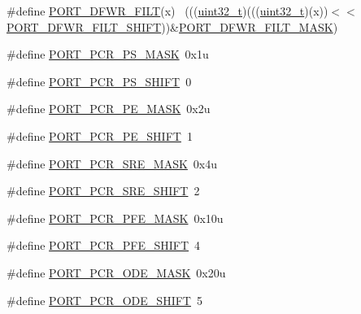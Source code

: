 \begin{DoxyCompactItemize}
\item 
\#define \hyperlink{group___p_o_r_t___register___masks_gad657e805a001c463d29fc307ecd4103e}{P\+O\+R\+T\+\_\+\+D\+F\+W\+R\+\_\+\+F\+I\+LT}(x)                                            ~(((\hyperlink{_p_e___types_8h_a33594304e786b158f3fb30289278f5af}{uint32\+\_\+t})(((\hyperlink{_p_e___types_8h_a33594304e786b158f3fb30289278f5af}{uint32\+\_\+t})(x))$<$$<$\hyperlink{group___p_o_r_t___register___masks_ga9045bd83bc548178d057bf4916c8fe08}{P\+O\+R\+T\+\_\+\+D\+F\+W\+R\+\_\+\+F\+I\+L\+T\+\_\+\+S\+H\+I\+FT}))\&\hyperlink{group___p_o_r_t___register___masks_gaf2f0bbe1dea504156dce840fdcb94b74}{P\+O\+R\+T\+\_\+\+D\+F\+W\+R\+\_\+\+F\+I\+L\+T\+\_\+\+M\+A\+SK})
\item 
\#define \hyperlink{group___p_o_r_t___register___masks_ga075e53298ec26cb1b463c95b902c39c1}{P\+O\+R\+T\+\_\+\+P\+C\+R\+\_\+\+P\+S\+\_\+\+M\+A\+SK}~0x1u
\item 
\#define \hyperlink{group___p_o_r_t___register___masks_ga7c040fa4d37750af5fef3ea1d0e370a9}{P\+O\+R\+T\+\_\+\+P\+C\+R\+\_\+\+P\+S\+\_\+\+S\+H\+I\+FT}~0
\item 
\#define \hyperlink{group___p_o_r_t___register___masks_ga125482aa2497e8435dac49c039b7fa97}{P\+O\+R\+T\+\_\+\+P\+C\+R\+\_\+\+P\+E\+\_\+\+M\+A\+SK}~0x2u
\item 
\#define \hyperlink{group___p_o_r_t___register___masks_ga18556773988cdd78e363959884dbec46}{P\+O\+R\+T\+\_\+\+P\+C\+R\+\_\+\+P\+E\+\_\+\+S\+H\+I\+FT}~1
\item 
\#define \hyperlink{group___p_o_r_t___register___masks_ga9cdf02a7b160ee528de8e18aad2cae60}{P\+O\+R\+T\+\_\+\+P\+C\+R\+\_\+\+S\+R\+E\+\_\+\+M\+A\+SK}~0x4u
\item 
\#define \hyperlink{group___p_o_r_t___register___masks_ga87657ecdc18eb5b344d4e399a3a2fb70}{P\+O\+R\+T\+\_\+\+P\+C\+R\+\_\+\+S\+R\+E\+\_\+\+S\+H\+I\+FT}~2
\item 
\#define \hyperlink{group___p_o_r_t___register___masks_ga7f1f5c3812018f9ed4d84a187146ba91}{P\+O\+R\+T\+\_\+\+P\+C\+R\+\_\+\+P\+F\+E\+\_\+\+M\+A\+SK}~0x10u
\item 
\#define \hyperlink{group___p_o_r_t___register___masks_gae7d057ebd3218784fca57f55a85f2d29}{P\+O\+R\+T\+\_\+\+P\+C\+R\+\_\+\+P\+F\+E\+\_\+\+S\+H\+I\+FT}~4
\item 
\#define \hyperlink{group___p_o_r_t___register___masks_gacbe19f0087a51a8c26c51838b7a555d2}{P\+O\+R\+T\+\_\+\+P\+C\+R\+\_\+\+O\+D\+E\+\_\+\+M\+A\+SK}~0x20u
\item 
\#define \hyperlink{group___p_o_r_t___register___masks_gac4871a3c3a20a51a3a57131d34e427e0}{P\+O\+R\+T\+\_\+\+P\+C\+R\+\_\+\+O\+D\+E\+\_\+\+S\+H\+I\+FT}~5
$$
\end{DoxyCompactItemize}
